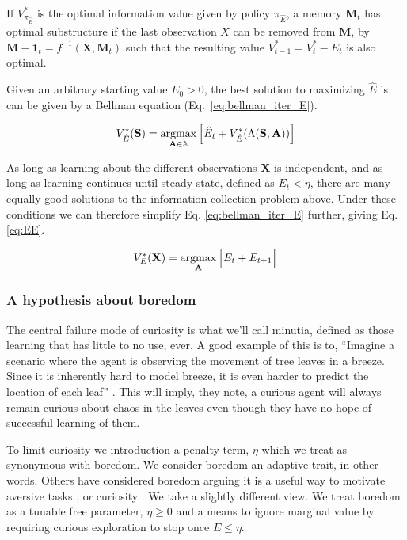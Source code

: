 \begin{theorem} \label{theorem:opt_sub} 
   If $V^*_{\pi_{\hat E}}$ is the optimal information value given by policy $\pi_{\hat E}$, a memory $\mathbf{M}_t$ has optimal substructure if the last observation $X$ can be removed from $\mathbf{M}$, by $\mathbf{M-1}_{t} = f^{-1}(\mathbf{X}, \mathbf{M}_t)$ such that the resulting value $V^*_{t-1} = V^*_{t} - E_{t}$ is also optimal. 
\end{theorem}

Given an arbitrary starting value $E_0 > 0$, the best solution to maximizing $\hat E$ is can be given by a Bellman equation (Eq.~\ref{eq:bellman_iter_E}).

\begin{equation} 
	\label{eq:bellman_iter_E}
	V^*_{\hat E}(\mathbf{S}) = \operatorname*{argmax}_{\mathbf{A} \in \mathbb{A}} \Big [ \hat E_{t}  + V^*_{\hat E}(\Lambda(\mathbf{S},\mathbf{A})) \Big ]
\end{equation}

As long as learning about the different observations $\mathbf{X}$ is independent, and as long as learning continues until steady-state, defined as $E_t < \eta$, there are many equally good solutions to the information collection problem above. Under these conditions we can therefore simplify Eq. \ref{eq:bellman_iter_E} further, giving Eq. \ref{eq:EE}. 

\begin{equation}
	\label{eq:EE} 
	V_E^{*}(\mathbf{X}) = \operatorname*{argmax}_{\mathbf{A}} \Big [ E_t + E_{t+1} \Big ]
\end{equation}

\subsubsection*{A hypothesis about boredom}
The central failure mode of curiosity is what we'll call minutia, defined as those learning that has little to no use, ever. A good example of this is to, ``Imagine a scenario where the agent is observing the movement of tree leaves in a breeze. Since it is inherently hard to model breeze, it is even harder to predict the location of each leaf'' \cite{Pathak2017}. This will imply, they note, a curious agent will always remain curious about chaos in the leaves even though they have no hope of successful learning of them.

To limit curiosity we introduction a penalty term, $\eta$ which we treat as synonymous with boredom. We consider boredom an adaptive trait, in other words. Others have considered boredom arguing it is a useful way to motivate aversive tasks \cite{Bench2013}, or curiosity \cite{Loewenstein1994}. We take a slightly different view. We treat boredom as a tunable free parameter, $\eta \ge 0$ and a means to ignore marginal value by requiring curious exploration to stop once $E \le \eta$. 


